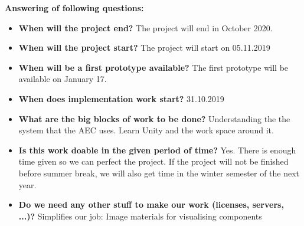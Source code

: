 \documentclass[12pt]{article}
\theoremstyle{definition}
\begin{document}
\textbf{Answering of following questions:}
\begin{itemize}
\item \textbf{When will the project end?}
The project will end in October 2020.
\item \textbf{When will the project start?}
The project will start on 05.11.2019
\item \textbf{When will be a first prototype available?}
The first prototype will be available on January 17.
\item \textbf{When does implementation work start?} 
31.10.2019
\item \textbf{What are the big blocks of work to be done?} Understanding the the system that the AEC uses.
Learn Unity and the work space around it.
\item \textbf{Is this work doable in the given period of time?} Yes. There is enough time given so we can perfect the project. If the project will not be finished before summer break, we will also get time in the winter semester of the next year.
\item \textbf{Do we need any other stuff to make our work (licenses, servers, ...)?}\newline
Simplifies our job: Image materials for visualising components
\end{itemize}
\end{document}
